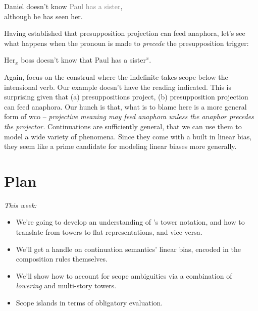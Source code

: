 \documentclass[nols,nofonts,nobib,nohyper]{tufte-book}
\begin{document}
    \ex
     Daniel doesn't know \textcolor{gray}{Paul has a
    sister},\\
    although he has seen her.
    \xe

    Having established that presupposition projection can feed anaphora,
    let's see what happens when the pronoun is made to \textit{precede} the
    presupposition trigger:

    \ex
    \ljudge{\#}Her$_{x}$ boss doesn't know that Paul has a sister$^{x}$.
    \xe

    Again, focus on the construal where the indefinite takes scope below
    the intensional verb. Our example doesn't have the reading indicated. This is surprising
    given that (a) presuppositions project, (b) presupposition projection can
    feed anaphora. Our hunch is that, what is to blame here is a more general form of \ac{wco}
    -- \textit{projective meaning may feed anaphora unless the anaphor precedes
    the projector.} Continuations are sufficiently general, that we can use them to model
    a wide variety of phenomena. Since they come with a built in linear
    bias, they
    seem like a prime candidate for modeling linear biases more generally.


\section{Plan}


\textit{This week:}

\begin{itemize}


    \item We're going to develop an understanding of \citeauthor{barkerShan2015}'s tower notation,
    and how to translate from towers to flat representations, and vice versa.

    \item We'll get a handle on continuation semantics' linear bias, encoded in the
    composition rules themselves.

    \item We'll show how to account for scope ambiguities via a combination of
    \textit{lowering} and multi-story towers.

    \item Scope islands in terms of obligatory evaluation.

\end{itemize}
\end{document}
